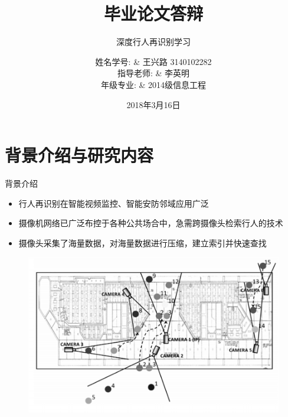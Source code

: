 \documentclass[notes]{beamer}
\title[毕设答辩]{\ahei   毕业论文答辩}
\subtitle{\akai  深度行人再识别学习}
\author[xinglu]{
	姓名学号: & 王兴路 3140102282 \\
	指导老师: & 李英明 \\
	年级专业: & 2014级信息工程
}
\institute[信工1403]{}
\date[\today]{2018年3月16日}
\newcommand{\hei}{\CJKfamily{hei}}
\begin{document}


\begin{frame}
	\titlepage
\end{frame}


\section{背景介绍与研究内容}

\begin{frame}
	{背景介绍}
	\begin{itemize}
		\item 行人再识别在智能视频监控、智能安防邻域应用广泛
		\item 摄像机网络已广泛布控于各种公共场合中，急需{\hei 跨摄像头}检索行人的技术
		\item 摄像头采集了{\hei 海量}数据，对海量数据进行压缩，建立索引并快速查找
	\end{itemize}
	\begin{figure}
		\includegraphics[width=0.75\linewidth]{2018-03-07-19-33-13.png}
	\end{figure}
\end{frame}
\end{document}
